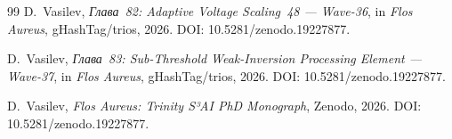 \begin{thebibliography}{99}
D.~Vasilev,
\emph{Глава~82: Adaptive Voltage Scaling~48 — Wave-36},
in \emph{Flos Aureus}, gHashTag/trios, 2026.
DOI: 10.5281/zenodo.19227877.

D.~Vasilev,
\emph{Глава~83: Sub-Threshold Weak-Inversion Processing Element — Wave-37},
in \emph{Flos Aureus}, gHashTag/trios, 2026.
DOI: 10.5281/zenodo.19227877.

D.~Vasilev,
\emph{Flos Aureus: Trinity S³AI PhD Monograph},
Zenodo, 2026.
DOI: 10.5281/zenodo.19227877.

\end{thebibliography}



